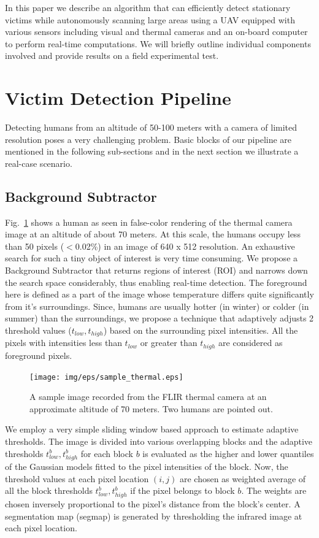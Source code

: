 \documentclass[runningheads]{llncs}
\begin{document}
In this paper we describe an algorithm that can efficiently detect stationary victims while autonomously scanning large areas using a UAV equipped with various sensors including visual and thermal cameras and an on-board computer to perform real-time computations. We will briefly outline individual components involved and provide results on a field experimental test.

\section{Victim Detection Pipeline}
Detecting humans from an altitude of 50-100 meters with a camera of limited resolution poses a very challenging problem. Basic blocks of our pipeline are mentioned in the following sub-sections and in the next section we illustrate a real-case scenario.

\subsection{Background Subtractor}
Fig.~\ref{fig:thermal_sample} shows a human as seen in false-color rendering of the thermal camera image at an altitude of about 70 meters. At this scale, the humans occupy less than 50 pixels ($<$0.02\%) in an image of 640 x 512 resolution. An exhaustive search for such a tiny object of interest is very time consuming. We propose a Background Subtractor that returns regions of interest (ROI) and narrows down the search space considerably, thus enabling real-time detection. The foreground here is defined as a part of the image whose temperature differs quite significantly from it's surroundings. Since, humans are usually hotter (in winter) or colder (in summer) than the surroundings, we propose a technique that adaptively adjusts 2 threshold values ($t_{low}, t_{high}$) based on the surrounding pixel intensities. All the pixels with intensities less than $t_{low}$ or greater than $t_{high}$ are considered as foreground pixels.

\begin{figure}
\centerline{\texttt{[image: img/eps/sample\_thermal.eps]}}
\caption{A sample image recorded from the FLIR thermal camera at an approximate altitude of 70 meters. Two humans are pointed out.}
\label{fig:thermal_sample}
\end{figure}

We employ a very simple sliding window based approach to estimate adaptive thresholds. The image is divided into various overlapping blocks and the adaptive thresholds $t_{low}^b, t_{high}^b$ for each block $b$ is evaluated as the higher and lower quantiles of the Gaussian models fitted to the pixel intensities of the block. Now, the threshold values at each pixel location $(i, j)$ are chosen as weighted average of all the block thresholds $t_{low}^b, t_{high}^b$ if the pixel belongs to block $b$. The weights are chosen inversely proportional to the pixel's distance from the block's center. A segmentation map (segmap) is generated by thresholding the infrared image at each pixel location.
\end{document}

